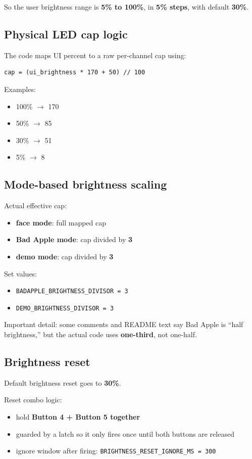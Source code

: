 \documentclass[11pt]{article}
\begin{document}
So the user brightness range is \textbf{5\% to 100\%}, in \textbf{5\% steps}, with default \textbf{30\%}.

\subsection{Physical LED cap logic}
The code maps UI percent to a raw per-channel cap using:
\begin{lstlisting}
cap = (ui_brightness * 170 + 50) // 100
\end{lstlisting}

Examples:
\begin{itemize}
  \item 100\% $\rightarrow$ 170
  \item 50\% $\rightarrow$ 85
  \item 30\% $\rightarrow$ 51
  \item 5\% $\rightarrow$ 8
\end{itemize}

\subsection{Mode-based brightness scaling}
Actual effective cap:
\begin{itemize}
  \item \textbf{face mode}: full mapped cap
  \item \textbf{Bad Apple mode}: cap divided by \textbf{3}
  \item \textbf{demo mode}: cap divided by \textbf{3}
\end{itemize}

Set values:
\begin{itemize}
  \item \texttt{BADAPPLE\_BRIGHTNESS\_DIVISOR = 3}
  \item \texttt{DEMO\_BRIGHTNESS\_DIVISOR = 3}
\end{itemize}

Important detail: some comments and README text say Bad Apple is ``half brightness,'' but the actual code uses \textbf{one-third}, not one-half.

\subsection{Brightness reset}
Default brightness reset goes to \textbf{30\%}.

Reset combo logic:
\begin{itemize}
  \item hold \textbf{Button 4 + Button 5 together}
  \item guarded by a latch so it only fires once until both buttons are released
  \item ignore window after firing: \texttt{BRIGHTNESS\_RESET\_IGNORE\_MS = 300}
\end{itemize}
\end{document}
